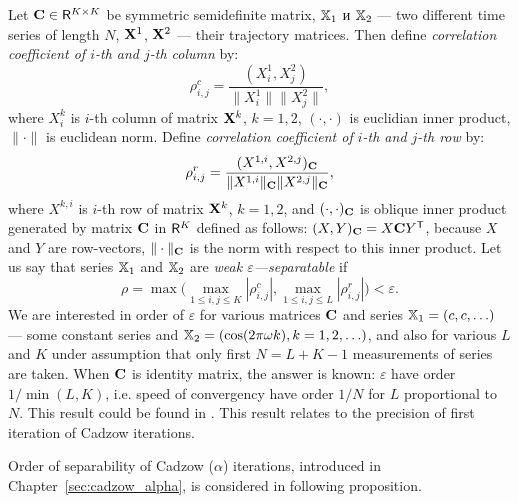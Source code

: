 \documentclass[12pt,a4paper,fleqn,leqno]{article}
\begin{document}
Let $\mathbf{C} \in \mathsf{R}^{K \times K}$ be symmetric semidefinite matrix, $\mathbb{X}_1$ и $\mathbb{X}_2$ ---  two different time series of length $N$, $\mathbf{X}^1$, $\mathbf{X}^2$ --- their trajectory matrices. Then define \emph{correlation coefficient of $i$-th and $j$-th column} by:
\begin{equation}\label{col_corr}
\rho^c_{i,j} = \frac{(X^1_i, X^2_j)}{\|X^1_i\| \|X^2_j\|},
\end{equation}
where $X^k_i$ is $i$-th column of matrix $\mathbf{X}^k$, $k = 1, 2$, $(\cdot, \cdot)$ is euclidian inner product, $\|\cdot\|$ is euclidean norm. Define \emph{correlation coefficient of $i$-th and $j$-th row} by:
\begin{equation}\label{row_corr}
\rho^r_{i,j} = \frac{(X^{1,i}, X^{2,j})_{\mathbf{C}}}{\|X^{1,i}\|_{\mathbf{C}} \|X^{2,j}\|_{\mathbf{C}}},
\end{equation}
where $X^{k,i}$ is $i$-th row of matrix $\mathbf{X}^k$, $k = 1, 2$, and $(\cdot, \cdot)_{\mathbf{C}}$ is oblique inner product generated by matrix $\mathbf{C}$ in $\mathsf{R}^K$ defined as follows: $(X, Y)_{\mathbf{C}} = X \mathbf{C} Y^{\mathsf{T}}$, because $X$ and $Y$ are row-vectors, $\| \cdot \|_{\mathbf{C}}$ is the norm with respect to this inner product. Let us say that series $\mathbb{X}_1$ and $\mathbb{X}_2$ are \emph{weak $\varepsilon$---separatable} if
\begin{equation}\label{weak_sep_eq}
\rho = \max\Big(\max_{1 \le i,j \le K}|\rho^c_{i,j}|, \max_{1 \le i,j \le L}|\rho^r_{i,j}|\Big) < \varepsilon.
\end{equation}
We are interested in order of $\varepsilon$ for various matrices $\mathbf{C}$ and series $\mathbb{X}_1 = (c, c, \ldots)$ --- some constant series and $\mathbb{X}_2 = (\cos(2 \pi \omega k), k = 1, 2, \ldots)$, and also for various $L$ and $K$ under assumption that only first $N = L + K - 1$ measurements of series are taken. When $\mathbf{C}$ is identity matrix, the answer is known: $\varepsilon$ have order $1/\min(L,K)$, i.e. speed of convergency have order $1/N$ for $L$ proportional to $N$.
This result could be found in \cite[Chapter 6.1]{Golyandina.etal2001}. This result relates to the precision of first iteration of Cadzow iterations.

Order of separability of Cadzow ($\alpha$) iterations, introduced in Chapter~\ref{sec:cadzow_alpha}, is considered in following proposition.
\end{document}
